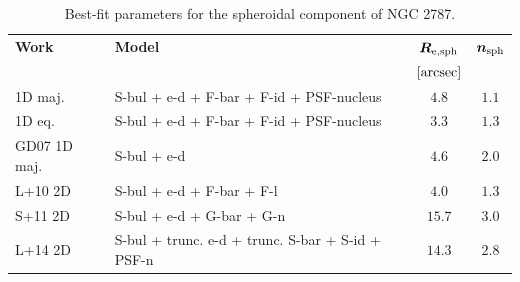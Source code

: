 \documentclass[preprint2]{emulateapj}
\begin{document}
\begin{figure}[h]
\begin{center}
{  %
  }
  \end{center}
  \end{figure}

  \begin{table}[h]
  \small
  \caption{Best-fit parameters for the spheroidal component of NGC 2787.}
  \begin{center}
  \begin{tabular}{llcc}
  \hline
  {\bf Work} & {\bf Model}   & $\bm R_{\rm e,sph}$    & $\bm n_{\rm sph}$ \\
    &  &  $[\rm arcsec]$ & \\
  \hline
  1D maj. & S-bul + e-d + F-bar + F-id + PSF-nucleus & $4.8$  &  $1.1$ \\
  1D eq.  & S-bul + e-d + F-bar + F-id + PSF-nucleus & $3.3$  &  $1.3$ \\
  \hline
  GD07 1D maj.         & S-bul + e-d					  & $4.6$   &  $2.0$ \\
  L+10 2D         & S-bul + e-d + F-bar + F-l			  & $4.0$   &  $1.3$ \\
  S+11 2D         & S-bul + e-d + G-bar + G-n			  & $15.7$  &  $3.0$ \\
  L+14 2D         & S-bul + trunc. e-d + trunc. S-bar + S-id + PSF-n & $14.3$  &  $2.8$ \\
  \hline
  \end{tabular}
  \end{center}
  \label{tab:n2787}
  \end{table}
\end{document}

